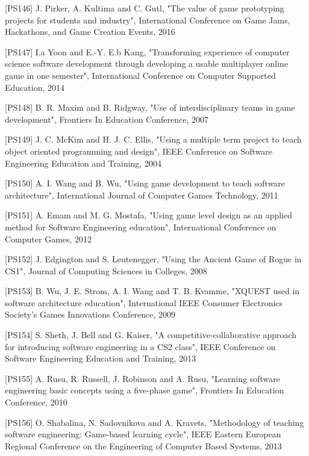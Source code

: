 [PS146]	J. Pirker, A. Kultima and C. Gutl, "The value of game prototyping projects for students and industry", International Conference on Game Jams, Hackathons, and Game Creation Events, 2016

[PS147]	I.a Yoon and E.-Y. E.b Kang, "Transforming experience of computer science software development through developing a usable multiplayer online game in one semester", International Conference on Computer Supported Education, 2014

[PS148]	B. R. Maxim and B. Ridgway, "Use of interdisciplinary teams in game development", Frontiers In Education Conference, 2007

[PS149]	J. C. McKim and H. J. C. Ellis, "Using a multiple term project to teach object oriented programming and design", IEEE Conference on Software Engineering Education and Training, 2004

[PS150]	A. I. Wang and B. Wu, "Using game development to teach software architecture", International Journal of Computer Games Technology, 2011

[PS151]	A. Emam and M. G. Mostafa, "Using game level design as an applied method for Software Engineering education", International Conference on Computer Games, 2012

[PS152]	J. Edgington and S. Leutenegger, "Using the Ancient Game of Rogue in CS1", Journal of Computing Sciences in Colleges, 2008

[PS153]	B. Wu, J. E. Strom, A. I. Wang and T. B. Kvamme, "XQUEST used in software architecture education", International IEEE Consumer Electronics Society's Games Innovations Conference, 2009

[PS154]	S. Sheth, J. Bell and G. Kaiser, "A competitive-collaborative approach for introducing software engineering in a CS2 class", IEEE Conference on Software Engineering Education and Training, 2013

[PS155]	A. Rusu, R. Russell, J. Robinson and A. Rusu, "Learning software engineering basic concepts using a five-phase game", Frontiers In Education Conference, 2010	

[PS156]	O. Shabalina, N. Sadovnikova and A. Kravets, "Methodology of teaching software engineering: Game-based learning cycle", IEEE Eastern European Regional Conference on the Engineering of Computer Based Systems, 2013

